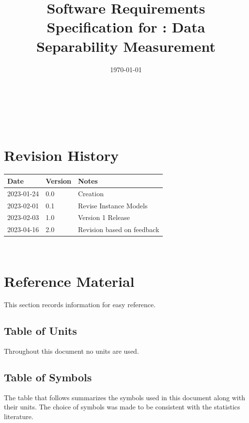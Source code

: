 \documentclass[12pt]{article}
\begin{document}
\title{Software Requirements Specification for \progname: Data Separability Measurement} 
\author{\authname}
\date{\today}
	
\maketitle

~\newpage


\tableofcontents

~\newpage

\section*{Revision History}

\begin{tabularx}{\textwidth}{p{3cm}p{2cm}X}
\toprule {\bf Date} & {\bf Version} & {\bf Notes}\\
\midrule
2023-01-24 & 0.0 & Creation \\
2023-02-01 & 0.1 & Revise Instance Models \\
2023-02-03 & 1.0 & Version 1 Release \\
2023-04-16 & 2.0 & Revision based on feedback \\
\bottomrule
\end{tabularx}

~\newpage

\section{Reference Material}

This section records information for easy reference.

\subsection{Table of Units}

Throughout this document no units are used.

\subsection{Table of Symbols}

The table that follows summarizes the symbols used in this document along with their units.  
The choice of symbols was made to be consistent with the statistics literature.
\end{document}
